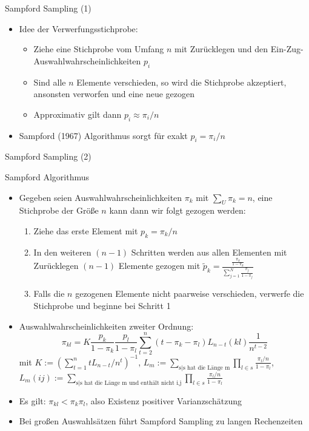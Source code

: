 \documentclass[9pt]{beamer}
\begin{document}
\begin{frame}{Sampford Sampling (1)}
\begin{itemize}
	\item Idee der Verwerfungsstichprobe: 
	\begin{itemize}
		\item Ziehe eine Stichprobe vom Umfang $n$ mit Zurücklegen und den Ein-Zug-Auswahlwahrscheinlichkeiten $p_i$
		\item Sind alle $n$ Elemente verschieden, so wird die Stichprobe akzeptiert, ansonsten verworfen und eine neue gezogen
		\item Approximativ gilt dann $p_i \approx \pi_i/n$		
	\end{itemize}
\item Sampford (1967) Algorithmus sorgt für exakt $p_i = \pi_i/n$
\end{itemize}

\end{frame}

\begin{frame}{Sampford Sampling (2)}\small
\begin{block}{Sampford Algorithmus}
	\begin{itemize}
		\item Gegeben seien Auswahlwahrscheinlichkeiten $\pi_k$ mit $\sum_U \pi_k = n$, eine Stichprobe der Größe $n$ kann dann wir folgt gezogen werden:
		\begin{enumerate}
			\item Ziehe das erste Element mit $p_k = \pi_k/n$
			\item In den weiteren $(n-1)$ Schritten werden aus allen Elementen mit Zurücklegen $(n-1)$ Elemente gezogen mit $\tilde{p}_k = \frac{\frac{\pi_k}{1-\pi_k}}{\sum_{j=1}^N \frac{\pi_j}{1-\pi_j}}$
			\item Falls die $n$ gezogenen Elemente nicht paarweise verschieden, verwerfe die Stichprobe und beginne bei Schritt 1 
		\end{enumerate}
		\item Auswahlwahrscheinlichkeiten zweiter Ordnung:
		$$ \pi_{kl} = K \frac{p_k}{1-\pi_k} \frac{p_l}{1-\pi_l}\sum_{t=2}^n (t-\pi_k - \pi_l) L_{n-t}(kl) \frac{1}{n^{t-2}}$$
		mit $K:=\left(\sum_{t=1}^{n}t L_{n-t}/n^t\right)^{-1}$,  $L_m := \underset{\text{s|s hat die Länge m}}{\sum} \prod_{l \in s} \frac{\pi_l/n}{1-\pi_l}$, $L_m(ij):=\underset{\text{s|s hat die Länge m und enthält nicht i,j}}{\sum} \prod_{l \in s} \frac{\pi_l/n}{1-\pi_l}$
		\item Es gilt: $\pi_{kl} < \pi_k \pi_l$, also Existenz positiver Varianzschätzung 
		\item Bei großen Auswahlsätzen führt Sampford Sampling zu langen Rechenzeiten
	\end{itemize}
\end{block}
\end{frame}
\end{document}
